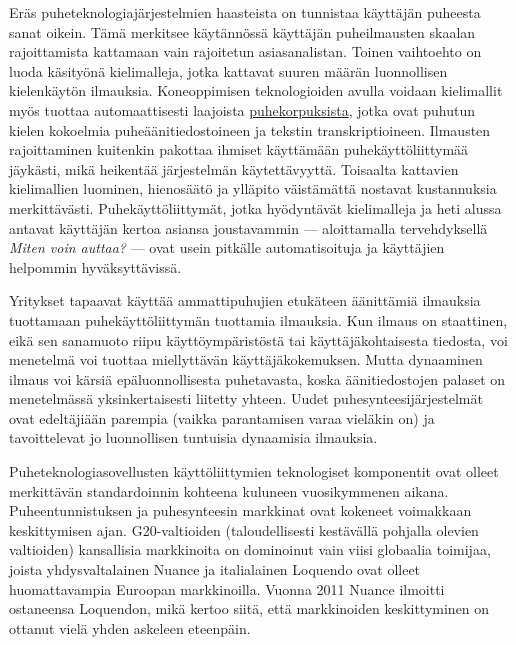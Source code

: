 \documentclass[]{../../metanetpaper}
\begin{document}
\begin{Parallel}[c]{70mm}{70mm}
{\begin{enumerate}
\end{enumerate}
Eräs puheteknologiajärjestelmien haasteista on tunnistaa käyttäjän
puheesta sanat oikein. Tämä merkitsee käytännössä käyttäjän
puheilmausten skaalan rajoittamista kattamaan vain rajoitetun
asiasanalistan. Toinen vaihtoehto on luoda käsityönä kielimalleja,
jotka kattavat suuren määrän luonnollisen kielenkäytön
ilmauksia. Koneoppimisen teknologioiden avulla voidaan kielimallit
myös tuottaa automaattisesti laajoista \underline{puhekorpuksista}, jotka ovat
puhutun kielen kokoelmia puheäänitiedostoineen ja tekstin
transkriptioineen. Ilmausten rajoittaminen kuitenkin pakottaa ihmiset
käyttämään puhekäyttöliittymää jäykästi, mikä heikentää järjestelmän
käytettävyyttä. Toisaalta kattavien kielimallien luominen, hienosäätö
ja ylläpito väistämättä nostavat kustannuksia
merkittävästi. Puhekäyttöliittymät, jotka hyödyntävät kielimalleja ja
heti alussa antavat käyttäjän kertoa asiansa joustavammin —
aloittamalla tervehdyksellä \textit{Miten voin auttaa?} — ovat usein
pitkälle automatisoituja ja käyttäjien helpommin hyväksyttävissä.

Yritykset tapaavat käyttää ammattipuhujien etukäteen äänittämiä
ilmauksia tuottamaan puhekäyttöliittymän tuottamia ilmauksia. Kun
ilmaus on staattinen, eikä sen sanamuoto riipu käyttöympäristöstä tai
käyttäjäkohtaisesta tiedosta, voi menetelmä voi tuottaa miellyttävän
käyttäjäkokemuksen. Mutta dynaaminen ilmaus voi kärsiä
epäluonnollisesta puhetavasta, koska äänitiedostojen palaset on
menetelmässä yksinkertaisesti liitetty yhteen. Uudet
puhesynteesijärjestelmät ovat edeltäjiään parempia (vaikka
parantamisen varaa vieläkin on) ja tavoittelevat jo luonnollisen
tuntuisia dynaamisia ilmauksia.

Puheteknologiasovellusten käyttöliittymien teknologiset komponentit
ovat olleet merkittävän standardoinnin kohteena kuluneen vuosikymmenen
aikana.  Puheentunnistuksen ja puhesynteesin markkinat ovat kokeneet
voimakkaan keskittymisen ajan. G20-valtioiden (taloudellisesti
kestävällä pohjalla olevien valtioiden) kansallisia markkinoita on
dominoinut vain viisi globaalia toimijaa, joista yhdysvaltalainen
Nuance ja italialainen Loquendo ovat olleet huomattavampia Euroopan
markkinoilla. Vuonna 2011 Nuance ilmoitti ostaneensa Loquendon, mikä
kertoo siitä, että markkinoiden keskittyminen on ottanut vielä yhden
askeleen eteenpäin.

}
\end{Parallel}
\end{document}
